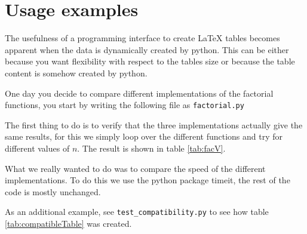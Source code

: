 \section{Usage examples}
The usefulness of a programming interface to create \LaTeX{}
tables becomes apparent when the data is dynamically created by python.
This can be either because you want flexibility with respect to the tables size
or because the table content is somehow created by python.

One day you decide to compare different implementations of the
factorial functions, you start by writing the following file
as \verb!factorial.py!


The first thing to do is to verify that the three implementations actually give
the same results, for this we simply loop over the different functions and try for
different values of $n$. The result is shown in table \ref{tab:facV}.



What we really wanted to do was to
compare the speed of the different implementations. To do this
we use the python package timeit, the rest of the code is mostly unchanged.



As an additional example, see \verb!test_compatibility.py! to see how table \ref{tab:compatibleTable}
was created.
%
%
 
